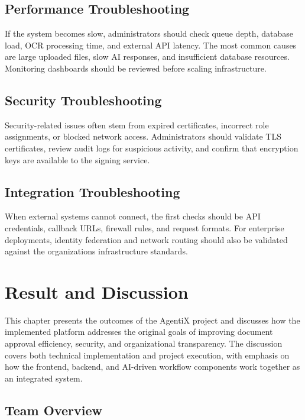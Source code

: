 \documentclass[12pt,oneside,openright,a4paper]{cpe-english-project}
\begin{document}
\section{Performance Troubleshooting}

If the system becomes slow, administrators should check queue depth, database load, OCR processing time, and external API latency. The most common causes are large uploaded files, slow AI responses, and insufficient database resources. Monitoring dashboards should be reviewed before scaling infrastructure.

\section{Security Troubleshooting}

Security-related issues often stem from expired certificates, incorrect role assignments, or blocked network access. Administrators should validate TLS certificates, review audit logs for suspicious activity, and confirm that encryption keys are available to the signing service.

\section{Integration Troubleshooting}

When external systems cannot connect, the first checks should be API credentials, callback URLs, firewall rules, and request formats. For enterprise deployments, identity federation and network routing should also be validated against the organization\textquotesingle s infrastructure standards.

\newpage

\chapter{Result and Discussion}

This chapter presents the outcomes of the AgentiX project and discusses how the implemented platform addresses the original goals of improving document approval efficiency, security, and organizational transparency. The discussion covers both technical implementation and project execution, with emphasis on how the frontend, backend, and AI-driven workflow components work together as an integrated system.

\section{Team Overview}
\end{document}
